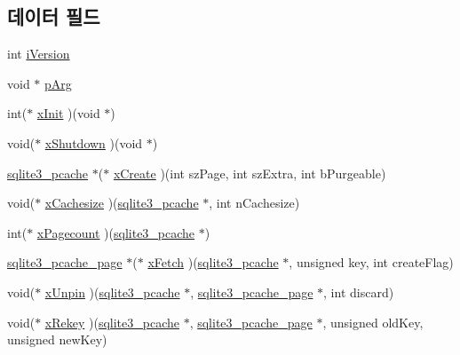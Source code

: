 \subsection*{데이터 필드}
\begin{DoxyCompactItemize}
\item 
int \hyperlink{structsqlite3__pcache__methods2_a03b27be6c7cb8f1d2662c454cbe58483}{i\+Version}
\item 
void $\ast$ \hyperlink{structsqlite3__pcache__methods2_aee83131f16bb88218d7b0339854719d6}{p\+Arg}
\item 
int($\ast$ \hyperlink{structsqlite3__pcache__methods2_a21f7fdd82d029d3b0567c573c012adfc}{x\+Init} )(void $\ast$)
\item 
void($\ast$ \hyperlink{structsqlite3__pcache__methods2_a4285fc03adf01cbd3283644a1072ffef}{x\+Shutdown} )(void $\ast$)
\item 
\hyperlink{sqlite3_8h_a096c453d937d51f7926d7d31c8e0bd2f}{sqlite3\+\_\+pcache} $\ast$($\ast$ \hyperlink{structsqlite3__pcache__methods2_aa8babc280d7ba89c6c279301d5a36d69}{x\+Create} )(int sz\+Page, int sz\+Extra, int b\+Purgeable)
\item 
void($\ast$ \hyperlink{structsqlite3__pcache__methods2_a76de689adc20fdbfef427b1c7ae1bcea}{x\+Cachesize} )(\hyperlink{sqlite3_8h_a096c453d937d51f7926d7d31c8e0bd2f}{sqlite3\+\_\+pcache} $\ast$, int n\+Cachesize)
\item 
int($\ast$ \hyperlink{structsqlite3__pcache__methods2_a16b85f7889b050702c739eccf2f0c036}{x\+Pagecount} )(\hyperlink{sqlite3_8h_a096c453d937d51f7926d7d31c8e0bd2f}{sqlite3\+\_\+pcache} $\ast$)
\item 
\hyperlink{structsqlite3__pcache__page}{sqlite3\+\_\+pcache\+\_\+page} $\ast$($\ast$ \hyperlink{structsqlite3__pcache__methods2_a6283d91a6ad5037fad33003c2198c9f7}{x\+Fetch} )(\hyperlink{sqlite3_8h_a096c453d937d51f7926d7d31c8e0bd2f}{sqlite3\+\_\+pcache} $\ast$, unsigned key, int create\+Flag)
\item 
void($\ast$ \hyperlink{structsqlite3__pcache__methods2_a8fcb4ba48106aac8dfff247baea06e1a}{x\+Unpin} )(\hyperlink{sqlite3_8h_a096c453d937d51f7926d7d31c8e0bd2f}{sqlite3\+\_\+pcache} $\ast$, \hyperlink{structsqlite3__pcache__page}{sqlite3\+\_\+pcache\+\_\+page} $\ast$, int discard)
\item 
void($\ast$ \hyperlink{structsqlite3__pcache__methods2_ad5b7609bdc0d2ae80325f7925b76c0af}{x\+Rekey} )(\hyperlink{sqlite3_8h_a096c453d937d51f7926d7d31c8e0bd2f}{sqlite3\+\_\+pcache} $\ast$, \hyperlink{structsqlite3__pcache__page}{sqlite3\+\_\+pcache\+\_\+page} $\ast$, unsigned old\+Key, unsigned new\+Key)

\end{DoxyCompactItemize}
